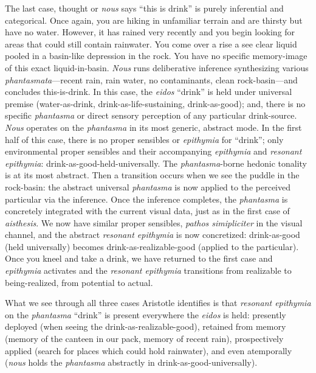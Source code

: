 \documentclass{article}
\begin{document}
The last case, thought or \textit{nous} says ``this is drink'' is purely inferential and categorical. Once again, you are hiking in unfamiliar terrain and are thirsty but have no water. However, it has rained very recently and you begin looking for areas that could still contain rainwater. You come over a rise a see clear liquid pooled in a basin-like depression in the rock. You have no specific memory-image of this exact liquid-in-basin. \textit{Nous} runs deliberative inference synthesizing various \textit{phantasmata}---recent rain, rain water, no contaminants, clean rock-basin---and concludes this-is-drink. In this case, the \textit{eidos} ``drink'' is held under universal premise (water-as-drink, drink-as-life-sustaining, drink-as-good); and, there is no specific \textit{phantasma} or direct sensory perception of any particular drink-source. \textit{Nous} operates on the \textit{phantasma} in its most generic, abstract mode. In the first half of this case, there is no proper sensibles or \textit{epithymia} for ``drink''; only environmental proper sensibles and their accompanying \textit{epithymia} and \textit{resonant epithymia}: drink-as-good-held-universally. The \textit{phantasma}-borne hedonic tonality is at its most abstract. Then a transition occurs when we see the puddle in the rock-basin: the abstract universal \textit{phantasma} is now applied to the perceived particular via the inference. Once the inference completes, the \textit{phantasma} is concretely integrated with the current visual data, just as in the first case of \textit{aisthesis}. We now have similar proper sensibles, \textit{pathos simipliciter} in the visual channel, and the abstract \textit{resonant epithymia} is now concretized: drink-as-good (held universally) becomes drink-as-realizable-good (applied to the particular). Once you kneel and take a drink, we have returned to the first case and \textit{epithymia} activates and the \textit{resonant epithymia} transitions from realizable to being-realized, from potential to actual. 

What we see through all three cases Aristotle identifies is that \textit{resonant epithymia} on the \textit{phantasma} ``drink'' is present everywhere the \textit{eidos} is held: presently deployed (when seeing the drink-as-realizable-good), retained from memory (memory of the canteen in our pack, memory of recent rain), prospectively applied (search for places which could hold rainwater), and even atemporally (\textit{nous} holds the \textit{phantasma} abstractly in drink-as-good-universally). 
\end{document}
